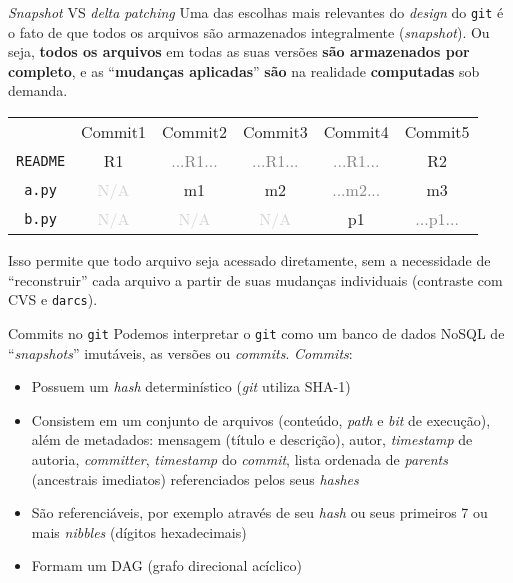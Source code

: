 \documentclass[utf8]{beamer}
\begin{document}
\begin{frame}{\emph{Snapshot} VS \emph{delta patching}}
  Uma das escolhas mais relevantes do \emph{design} do \texttt{git}
  é o fato de que todos os arquivos são armazenados integralmente
  (\emph{snapshot}).
  Ou seja, \textbf{todos os arquivos} em todas as suas versões
  \textbf{são armazenados por completo},
  e as ``\textbf{mudanças aplicadas}''
  \textbf{são} na realidade \textbf{computadas} sob demanda.
  \vfill%
  \begin{tabular}{cccccc}
      & Commit1 & Commit2 & Commit3 & Commit4 & Commit5 \\
    \texttt{README}
      & R1
      & \textcolor{gray}{...R1...}
      & \textcolor{gray}{...R1...}
      & \textcolor{gray}{...R1...}
      & R2
      \\
    \texttt{a.py}
      & \textcolor{lightgray}{N/A}
      & m1
      & m2
      & \textcolor{gray}{...m2...}
      & m3
      \\
    \texttt{b.py}
      & \textcolor{lightgray}{N/A}
      & \textcolor{lightgray}{N/A}
      & \textcolor{lightgray}{N/A}
      & p1
      & \textcolor{gray}{...p1...}
      \\
  \end{tabular}
  \vfill%
  Isso permite que todo arquivo seja acessado diretamente,
  sem a necessidade de ``reconstruir'' cada arquivo
  a partir de suas mudanças individuais
  (contraste com CVS e \texttt{darcs}).
\end{frame}

\begin{frame}{Commits no \texttt{git}}
  Podemos interpretar o \texttt{git} como um banco de dados NoSQL
  de ``\emph{snapshots}'' imutáveis, as versões ou \emph{commits}.
  \emph{Commits}:
  \begin{itemize}
    \item
      Possuem um \emph{hash} determinístico (\emph{git} utiliza SHA-1)
    \item
      Consistem em um conjunto de arquivos
      (conteúdo, \emph{path} e \emph{bit} de execução),
      além de metadados: mensagem (título e descrição),
      autor, \emph{timestamp} de autoria,
      \emph{committer}, \emph{timestamp} do \emph{commit},
      lista ordenada de \emph{parents} (ancestrais imediatos)
      referenciados pelos seus \emph{hashes}
    \item
      São referenciáveis, por exemplo através de seu \emph{hash}
      ou seus primeiros 7 ou mais \emph{nibbles} (dígitos hexadecimais)
    \item
      Formam um DAG (grafo direcional acíclico)
  \end{itemize}
\end{frame}
\end{document}
